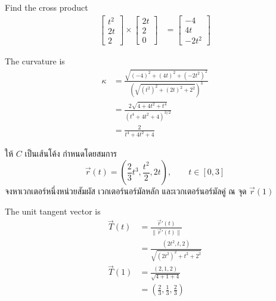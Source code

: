 \documentclass[12pt,final]{novelette} %
\begin{document}
\begin{question}
\begin{question}
        Find the cross product
        \begin{align*}
            \begin{bmatrix}
                t^2 \\ 2t \\ 2
            \end{bmatrix}
            \times
            \begin{bmatrix}
                2t \\ 2 \\ 0
            \end{bmatrix}
             & =
            \begin{bmatrix}
                -4 \\ 4t \\ -2t^2
            \end{bmatrix}
        \end{align*}

        The curvature is
        \begin{align*}
            \kappa & = \frac{\sqrt{(-4)^2 + (4t)^2 + (-2t^2)^2}}{\left(\sqrt{(t^2)^2 + (2t)^2 + 2^2}\right)^3} \\
                   & = \frac{2\sqrt{4+4t^2+t^4}}{\left(t^4 + 4t^2 + 4\right)^{3/2}}                            \\
                   & = \boxed{\frac{2}{t^4 + 4t^2 + 4}}
        \end{align*}

        \item
        ให้ $C$ เป็นเส้นโค้ง กำหนดโดยสมการ
        $$
            \vec{r}(t) = \left(\frac23 t^3, \frac{t^2}{2}, 2t\right), \qquad t \in [0, 3]
        $$
        จงหาเวกเตอร์หนึ่งหน่วยสัมผัส เวกเตอร์นอร์มัลหลัก และเวกเตอร์นอร์มัลคู่ ณ จุด $\vec{r}(1)$ 

        \bigskip
        The unit tangent vector is
        \begin{align*}
            \vec{T}(t) & = \frac{\vec{r}'(t)}{\lVert \vec{r}'(t) \rVert}    \\
                       & = \frac{(2t^2, t, 2)}{\sqrt{(2t^2)^2 + t^2 + 2^2}} \\
            \vec{T}(1) & = \frac{(2, 1, 2)}{\sqrt{4 + 1 + 4}}               \\
                       & = \boxed{\left(\frac23, \frac13, \frac23\right)}
        \end{align*}


\end{question}
\end{question}
\end{document}
